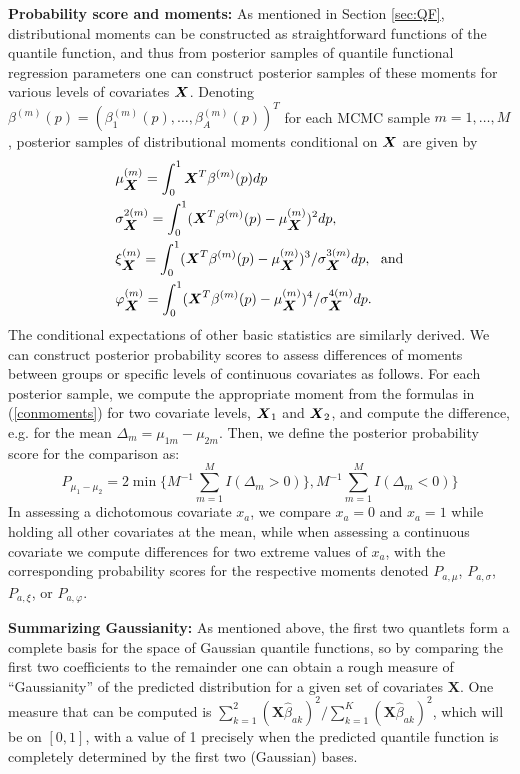 \documentclass[11pt]{article}
\newcommand{\bX}{\mbox{\boldmath $X$}}
\begin{document}
\textbf{Probability score and moments:}  
As mentioned in Section \ref{sec:QF}, distributional moments can be constructed as straightforward
functions of the quantile function, and thus from posterior samples of quantile functional regression
parameters one can construct posterior samples of these moments for various levels of covariates
$\bX$.
Denoting ${\beta}^{(m)}(p)=({\beta}_1^{(m)}(p), \dots, {\beta}_A^{(m)}(p))^{T}$ 
for each MCMC sample $m=1,\ldots,M$, posterior samples of distributional moments conditional
on $\bX$ are given by
 \begin{align}  \label{conmoments}
&{ \mu}^{(m)}_{\bX}  =  \int_{0}^{1} \bX^{T}\beta^{(m)}(p)  dp   \notag \\ 
&{\sigma}^{2(m)}_{\bX} =  \int_{0}^{1}(\bX^{T}\beta^{(m)}(p) - { \mu}^{(m)}_{\bX}  )^2 dp,   \notag \\ 
&{\xi}^{(m)}_{\bX}=  \int_{0}^{1}(\bX^{T}\beta^{(m)}(p) -{ \mu}^{(m)}_{\bX}  )^3/{\sigma}^{3(m)}_{\bX} dp, ~~\text{and}\notag \\  
&{\varphi}^{(m)}_{\bX}=   \int_{0}^{1}(\bX^{T}\beta^{(m)}(p) - { \mu}^{(m)}_{\bX} )^4/{\sigma}^{4(m)}_{\bX} dp.  
\end{align}
The conditional expectations of other basic statistics are similarly derived.   
We can construct posterior probability scores to assess differences of moments between groups or specific levels of continuous covariates as follows.  For each posterior sample, we compute the appropriate moment from the formulas in (\ref{conmoments}) for two covariate levels, $\bX_1$ and $\bX_2$, and compute the difference, e.g. for the mean $\Delta_m = \mu_{1m} - \mu_{2m}$.  Then, we 
define the posterior probability score for the comparison as:
$$P_{\mu_1-\mu_2}=2\min{\{  M^{-1} \sum_{m=1}^{M}I(\Delta_m>0) \},  M^{-1} \sum_{m=1}^{M}I(\Delta_m<0) \}}$$
In assessing a dichotomous covariate $x_{a}$, we compare $x_a=0$ and $x_a=1$ while holding all other covariates at the mean, while when assessing a continuous covariate we compute differences for two extreme values of $x_a$, with the corresponding probability scores for the respective moments denoted $P_{a,\mu}$, $P_{a,\sigma}$, $P_{a,\xi}$, or $P_{a,\varphi}$.

\textbf{Summarizing Gaussianity:}  
As mentioned above, the first two quantlets form a complete basis for the space of Gaussian quantile functions, so by comparing the first two coefficients to the remainder one can obtain a rough measure of ``Gaussianity'' of the predicted
distribution for a given set of covariates $\mathbf{X}$.  One measure that can be computed is $\sum_{k=1}^2 (\mathbf{X} \hat{\beta}_{ak})^2/\sum_{k=1}^K (\mathbf{X}\hat{\beta}_{ak})^2$, which will be on $[0,1]$, with a value of 1 precisely when the predicted quantile function is completely determined by the first two (Gaussian) bases.
\end{document}
